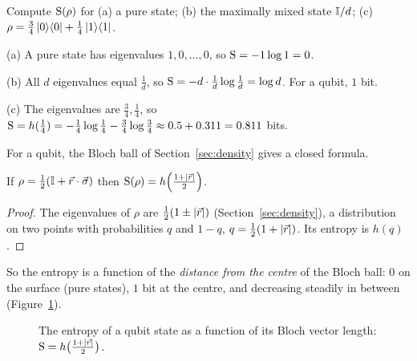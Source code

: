 \begin{example}\label{ex:vn-basic}
  Compute $\mathrm{S}(\rho)$ for (a) a pure state; (b) the maximally mixed state $\mathbb{I}/d$; (c) $\rho=\tfrac34\left|0\right\rangle\!\left\langle0\right|+\tfrac14\left|1\right\rangle\!\left\langle1\right|$.
\end{example}
\begin{solution}
  \begin{steps}
    \item (a) A pure state has eigenvalues $1,0,\dots,0$, so $\mathrm{S}=-1\log1=0$.
    \item (b) All $d$ eigenvalues equal $\tfrac1d$, so $\mathrm{S}=-d\cdot\tfrac1d\log\tfrac1d=\log d$. For a qubit, $1$ bit.
    \item (c) The eigenvalues are $\tfrac34,\tfrac14$, so $\mathrm{S}=h(\tfrac14)=-\tfrac14\log\tfrac14-\tfrac34\log\tfrac34\approx0.5+0.311=0.811$ bits.
  \end{steps}
\end{solution}

For a qubit, the Bloch ball of Section~\ref{sec:density} gives a closed formula.

\begin{proposition}\label{prop:qubit-entropy}
  If $\rho=\tfrac12(\mathbb{I}+\vec r\cdot\vec\sigma)$ then $\mathrm{S}(\rho)=h\!\left(\tfrac{1+\left|\vec r\right|}{2}\right)$.
\end{proposition}
\begin{proof}
  The eigenvalues of $\rho$ are $\tfrac12(1\pm\left|\vec r\right|)$ (Section~\ref{sec:density}), a distribution on two points with probabilities $q$ and $1-q$, $q=\tfrac12(1+\left|\vec r\right|)$. Its entropy is $h(q)$.
\end{proof}

So the entropy is a function of the \emph{distance from the centre} of the Bloch ball: $0$ on the surface (pure states), $1$ bit at the centre, and decreasing steadily in between (Figure~\ref{fig:entropy-ball}).

\begin{figure}[htb]
  \centering
  \caption{The entropy of a qubit state as a function of its Bloch vector length: $\mathrm{S}=h\bigl(\frac{1+\left|\vec r\right|}2\bigr)$.}
  \label{fig:entropy-ball}
\end{figure}

